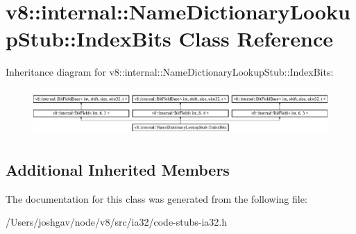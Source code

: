 \hypertarget{classv8_1_1internal_1_1_name_dictionary_lookup_stub_1_1_index_bits}{}\section{v8\+:\+:internal\+:\+:Name\+Dictionary\+Lookup\+Stub\+:\+:Index\+Bits Class Reference}
\label{classv8_1_1internal_1_1_name_dictionary_lookup_stub_1_1_index_bits}
Inheritance diagram for v8\+:\+:internal\+:\+:Name\+Dictionary\+Lookup\+Stub\+:\+:Index\+Bits\+:\begin{figure}[H]
\begin{center}
\leavevmode
\includegraphics[height=1.800643cm]{classv8_1_1internal_1_1_name_dictionary_lookup_stub_1_1_index_bits}
\end{center}
\end{figure}
\subsection*{Additional Inherited Members}


The documentation for this class was generated from the following file\+:\begin{DoxyCompactItemize}
\item 
/\+Users/joshgav/node/v8/src/ia32/code-\/stubs-\/ia32.\+h\end{DoxyCompactItemize}
